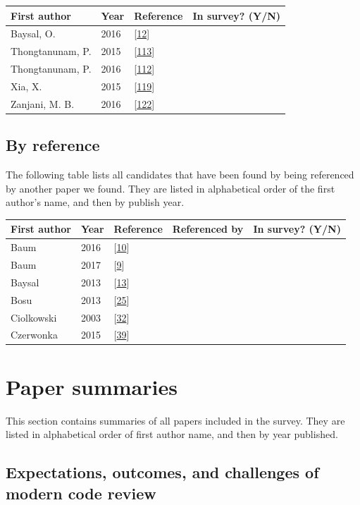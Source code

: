 \documentclass[]{book}
\begin{document}
\begin{longtable}[]{@{}llll@{}}
\toprule
First author & Year & Reference & In survey? (Y/N)\tabularnewline
\midrule
\endhead
Baysal, O. & 2016 &
{[}\protect\hyperlink{ref-baysal2016investigating}{12}{]}
&\tabularnewline
Thongtanunam, P. & 2015 &
{[}\protect\hyperlink{ref-thongtanunam2015should}{113}{]}
&\tabularnewline
Thongtanunam, P. & 2016 &
{[}\protect\hyperlink{ref-thongtanunam2016revisiting}{112}{]}
&\tabularnewline
Xia, X. & 2015 & {[}\protect\hyperlink{ref-xia2015should}{119}{]}
&\tabularnewline
Zanjani, M. B. & 2016 &
{[}\protect\hyperlink{ref-zanjani2016automatically}{122}{]}
&\tabularnewline
\bottomrule
\end{longtable}

\subsection{By reference}\label{by-reference}

The following table lists all candidates that have been found by being
referenced by another paper we found. They are listed in alphabetical
order of the first author's name, and then by publish year.

\begin{longtable}[]{@{}lllll@{}}
\toprule
First author & Year & Reference & Referenced by & In survey?
(Y/N)\tabularnewline
\midrule
\endhead
Baum & 2016 & {[}\protect\hyperlink{ref-baum2016faceted}{10}{]} &
&\tabularnewline
Baum & 2017 & {[}\protect\hyperlink{ref-baum2017choice}{9}{]} &
&\tabularnewline
Baysal & 2013 & {[}\protect\hyperlink{ref-baysal2013influence}{13}{]} &
&\tabularnewline
Bosu & 2013 & {[}\protect\hyperlink{ref-bosu2013impact}{25}{]} &
&\tabularnewline
Ciolkowski & 2003 &
{[}\protect\hyperlink{ref-ciolkowski2003software}{32}{]} &
&\tabularnewline
Czerwonka & 2015 & {[}\protect\hyperlink{ref-czerwonka2015code}{39}{]} &
&\tabularnewline
\bottomrule
\end{longtable}

\section{Paper summaries}\label{paper-summaries}

This section contains summaries of all papers included in the survey.
They are listed in alphabetical order of first author name, and then by
year published.

\subsection{Expectations, outcomes, and challenges of modern code
review}\label{expectations-outcomes-and-challenges-of-modern-code-review}
\end{document}

